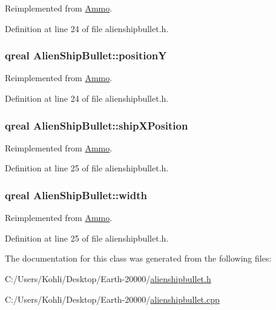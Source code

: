 Reimplemented from \hyperlink{class_ammo_a7df8c23c0a3023e013c25e2b3fff5385}{Ammo}.

Definition at line 24 of file alienshipbullet.h.\hypertarget{class_alien_ship_bullet_a1315cc85ceb3c3573305d78e651b1330}{
\subsubsection[{positionY}]{\setlength{\rightskip}{0pt plus 5cm}qreal {\bf AlienShipBullet::positionY}}}
\label{class_alien_ship_bullet_a1315cc85ceb3c3573305d78e651b1330}


Reimplemented from \hyperlink{class_ammo_a71fc5db64ac2f32ca10e22f7a7ff0c88}{Ammo}.

Definition at line 24 of file alienshipbullet.h.\hypertarget{class_alien_ship_bullet_a9fd89e42b168c49956e30a8a6f33304e}{
\subsubsection[{shipXPosition}]{\setlength{\rightskip}{0pt plus 5cm}qreal {\bf AlienShipBullet::shipXPosition}}}
\label{class_alien_ship_bullet_a9fd89e42b168c49956e30a8a6f33304e}


Reimplemented from \hyperlink{class_ammo_a86583f8632ca9604ef0ae839d78fe5ef}{Ammo}.

Definition at line 25 of file alienshipbullet.h.\hypertarget{class_alien_ship_bullet_a08bb3094350eab416509120e76987df5}{
\subsubsection[{width}]{\setlength{\rightskip}{0pt plus 5cm}qreal {\bf AlienShipBullet::width}}}
\label{class_alien_ship_bullet_a08bb3094350eab416509120e76987df5}


Reimplemented from \hyperlink{class_ammo_aad7996f9abdcb6ade7e67f7c7f5e5ebe}{Ammo}.

Definition at line 25 of file alienshipbullet.h.

The documentation for this class was generated from the following files:\begin{DoxyCompactItemize}
\item 
C:/Users/Kohli/Desktop/Earth-\/20000/\hyperlink{alienshipbullet_8h}{alienshipbullet.h}\item 
C:/Users/Kohli/Desktop/Earth-\/20000/\hyperlink{alienshipbullet_8cpp}{alienshipbullet.cpp}\end{DoxyCompactItemize}
